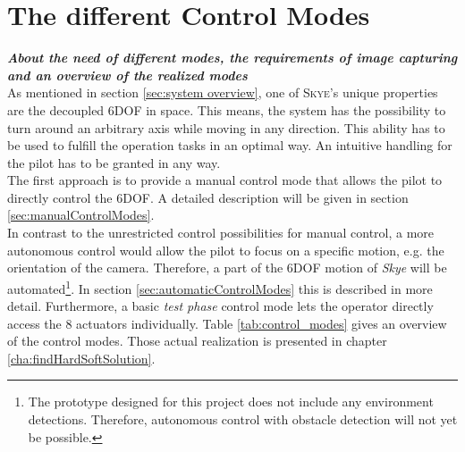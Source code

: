 \graphicspath{{graphics/HMI/}{graphics/control_modes/}}
\chapter{The different Control Modes}
\label{cha:DifferentControlModes}

\textbf{\textit{About the need of different modes, the requirements of image capturing and an overview of the realized modes}} \\

As mentioned in section \ref{sec:system overview}, one of \textsc{Skye}'s unique properties are the decoupled 6DOF in space. This means, the system has the possibility to turn around an arbitrary axis while moving in any direction. This ability has to be used to fulfill the operation tasks in an optimal way. An intuitive handling for the pilot has to be granted in any way. \\ 
The first approach is to provide a manual control mode that allows the pilot to directly control the 6DOF. A detailed description will be given in section \ref{sec:manualControlModes}. \\ 
In contrast to the unrestricted control possibilities for manual control, a more autonomous control would allow the pilot to focus on a specific motion, e.g. the orientation of the camera. Therefore, a part of the 6DOF motion of \textit{Skye} will be automated\footnote{The prototype designed for this project does not include any environment detections. Therefore, autonomous control with obstacle detection will not yet be possible.}. In section \ref{sec:automaticControlModes} this is described in more detail. Furthermore, a basic \textit{test phase} control mode lets the operator directly access the 8 actuators individually. Table \ref{tab:control_modes} gives an overview of the control modes. Those actual realization is presented in chapter \ref{cha:findHardSoftSolution}.

